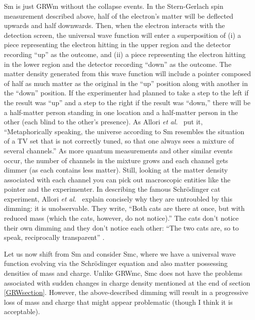 \documentclass[12pt,onecolumn,secnumarabic,amsmath,amssymb,balancelastpage,nofootinbib]{article}
\begin{document}
Sm is just GRWm without the collapse events.  In the Stern-Gerlach spin measurement described above, half of the electron's matter will be deflected upwards and half downwards.  Then, when the electron interacts with the detection screen, the universal wave function will enter a superposition of (i) a piece representing the electron hitting in the upper region and the detector recording ``up'' as the outcome, and (ii) a piece representing the electron hitting in the lower region and the detector recording ``down'' as the outcome.  The matter density generated from this wave function will include a pointer composed of half as much matter as the original in the ``up'' position along with another in the ``down'' position.  If the experimenter had planned to take a step to the left if the result was ``up'' and a step to the right if the result was ``down,'' there will be a half-matter person standing in one location and a half-matter person in the other (each blind to the other's presence).  As Allori \emph{et al.}\ \cite[pg.\ 8]{allori2011} put it, ``Metaphorically speaking, the universe according to Sm resembles the situation of a TV set that is not correctly tuned, so that one always sees a mixture of several channels.''  As more quantum measurements and other similar events occur, the number of channels in the mixture grows and each channel gets dimmer (as each contains less matter).  Still, looking at the matter density associated with each channel you can pick out macroscopic entities like the pointer and the experimenter.  In describing the famous Schr\"{o}dinger cat experiment, Allori \emph{et al.}\ \cite[pg.\ 345--346]{allori2014} explain concisely why they are untroubled by this dimming: it is unobservable.  They write, ``Both cats are there at once, but with reduced mass (which the cats, however, do not notice).''  The cats don't notice their own dimming and they don't notice each other: ``The two cats are, so to speak, reciprocally transparent'' \cite[pg.\ 7]{allori2011}.

Let us now shift from Sm and consider Smc, where we have a universal wave function evolving via the Schr\"{o}dinger equation and also matter possessing densities of mass and charge.  Unlike GRWmc, Smc does not have the problems associated with sudden changes in charge density mentioned at the end of section \ref{GRWsection}.  However, the above-described dimming will result in a progressive loss of mass and charge that might appear problematic (though I think it is acceptable).
\end{document}

